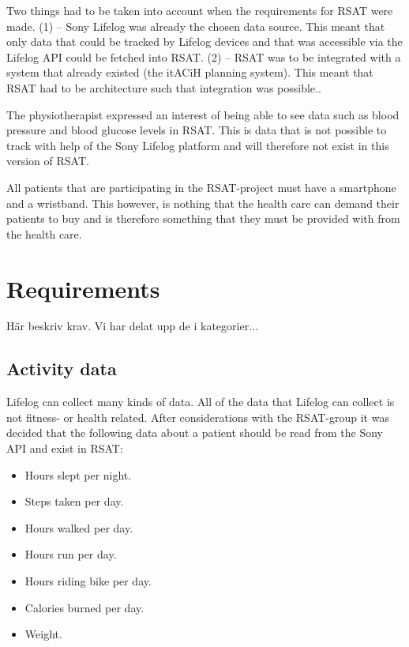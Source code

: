\documentclass{cslthse-msc}
\begin{document}
Two things had to be taken into account when the requirements for RSAT were made. (1) – Sony Lifelog was already the chosen data source. This meant that only data that could be tracked by Lifelog devices and that was accessible via the Lifelog API could be fetched into RSAT.  (2) – RSAT was to be integrated with a system that already existed (the itACiH planning system).  This meant that RSAT had to be architecture such that integration was possible..

The physiotherapist expressed an interest of being able to see data such as blood pressure and blood glucose levels in RSAT. This is data that is not possible to track with help of the Sony Lifelog platform and will therefore not exist in this version of RSAT.

All patients that are participating in the RSAT-project must have a smartphone and a wristband. This however, is nothing that the health care can demand their patients to buy and is therefore something that they must be provided with from the health care.


\section{Requirements}
\label{sec:req}

Här beskriv krav. Vi har delat upp de i kategorier...

\subsection{Activity data}



Lifelog can collect many kinds of data. All of the data that Lifelog can collect is not fitness- or health related. After considerations with the RSAT-group it was decided that the following data about a patient should be read from the Sony API and exist in RSAT:

\begin{itemize}
    \item Hours slept per night.
    \item Steps taken per day.
    \item Hours walked per day.
    \item Hours run per day.
    \item Hours riding bike per day.
    \item Calories burned per day.
    \item Weight.
\end{itemize}
\end{document}
